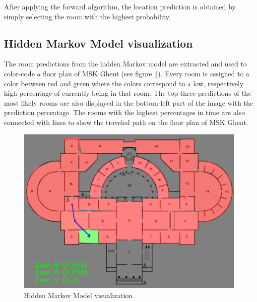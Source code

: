 After applying the forward algorithm, the location prediction is obtained by simply selecting the room with the highest probability.


\subsection{Hidden Markov Model visualization}

The room predictions from the hidden Markov model are extracted and used to color-code a floor plan of MSK Ghent (see figure \ref{fig:hmm-viz}). Every room is assigned to a color between red and green where the colors correspond to a low, respectively high percentage of currently being in that room. The top three predictions of the most likely rooms are also displayed in the bottom-left part of the image with the prediction percentage. 
The rooms with the highest percentages in time are also connected with lines to show the traveled path on the floor plan of MSK Ghent.

\begin{figure}[htbp]
    \includegraphics[width=\linewidth]{images/hmm-vis.png}
    \caption{Hidden Markov Model visualization}
    \label{fig:hmm-viz}
\end{figure}